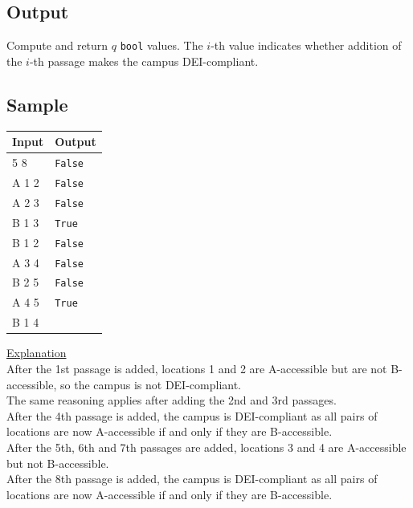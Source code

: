 \documentclass[a4paper]{exam}
\begin{document}
\begin{questions}
  \subsection*{Output}
  Compute and return $q$ \texttt{bool} values. The $i$-th value indicates whether addition of the $i$-th passage makes the campus DEI-compliant.

  \subsection*{Sample}
  \begin{minipage}[t]{.21\textwidth}
    \begin{tabular}[t]{|l|l|}
      \hline
      Input & Output         \\
      \hline
      5 8   & \texttt{False} \\
      A 1 2 & \texttt{False} \\
      A 2 3 & \texttt{False} \\
      B 1 3 & \texttt{True}  \\
      B 1 2 & \texttt{False} \\
      A 3 4 & \texttt{False} \\
      B 2 5 & \texttt{False} \\
      A 4 5 & \texttt{True}  \\
      B 1 4 &                \\
      \hline
    \end{tabular}
  \end{minipage}
  \begin{minipage}[t]{.78\textwidth}
    \underline{Explanation}\\
    After the 1st passage is added, locations 1 and 2 are A-accessible but are not B-accessible, so the campus is not DEI-compliant.\\
    The same reasoning applies after adding the 2nd and 3rd passages.\\
    After the 4th passage is added, the campus is DEI-compliant as all pairs of locations are now A-accessible if and only if they are B-accessible.\\
    After the 5th, 6th and 7th passages are added, locations 3 and 4 are A-accessible but not B-accessible.\\
    After the 8th passage is added,  the campus is DEI-compliant as all pairs of locations are now A-accessible if and only if they are B-accessible.\\
  \end{minipage}


\end{questions}
\end{document}
